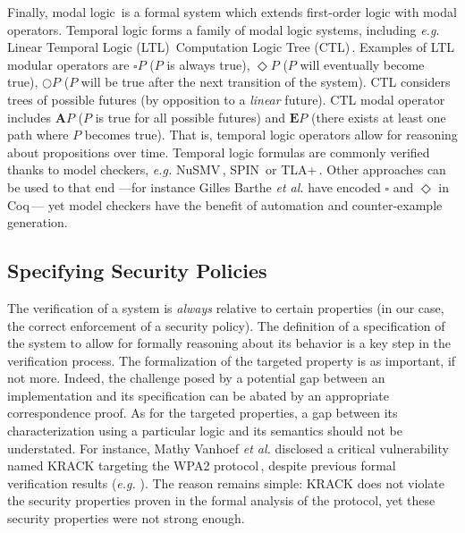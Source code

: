 Finally, modal logic\,\cite{chagrov1997modal} is a formal system which extends
first-order logic with modal operators.
%
Temporal logic forms a family of modal logic systems, including \emph{e.g.}
Linear Temporal Logic (LTL)\,\cite{sistla1985ltl} Computation Logic Tree
(CTL)\,\cite{clarke1981ctl}.
%
Examples of LTL modular operators are \( \square P \) (\( P \) is always true),
\( \Diamond P \) (\( P \) will eventually become true), \( \bigcirc P \)
(\( P \) will be true after the next transition of the system).
%
CTL considers trees of possible futures (by opposition to a \emph{linear}
future).
%
CTL modal operator includes \( \mathbf{A} P \) (\( P \) is true for all possible
futures) and \( \mathbf{E} P \) (there exists at least one path where \( P \)
becomes true).
%
That is, temporal logic operators allow for reasoning about propositions over
time.
%
Temporal logic formulas are commonly verified thanks to model checkers,
\emph{e.g.}  NuSMV\,\cite{cimatti2002nusmv}, SPIN\,\cite{holzmann1997spin} or
TLA+\,\cite{lamport2002tla}.
%
Other approaches can be used to that end ---for instance Gilles Barthe \emph{et
  al.} have encoded \( \square \) and \( \Diamond \) in
Coq\,\cite{barthe2011virtcert1}--- yet model checkers have the benefit of
automation and counter-example generation.

\subsection{Specifying Security Policies}
\label{subsec:sota:security}

The verification of a system is \emph{always} relative to certain properties (in
our case, the correct enforcement of a security policy).
%
The definition of a specification of the system to allow for formally reasoning
about its behavior is a key step in the verification process.
%
The formalization of the targeted property is as important, if not more.
%
Indeed, the challenge posed by a potential gap between an implementation and its
specification can be abated by an appropriate correspondence proof.
%
As for the targeted properties, a gap between its characterization using a
particular logic and its semantics should not be understated.
%
For instance, Mathy Vanhoef \emph{et al.} disclosed a critical vulnerability
named KRACK targeting the WPA2 protocol\,\cite{vanhoef2017key}, despite previous
formal verification results (\emph{e.g.} \cite{he2004analysis}).
%
The reason remains simple: KRACK does not violate the security properties proven
in the formal analysis of the protocol, yet these security properties were not
strong enough.

